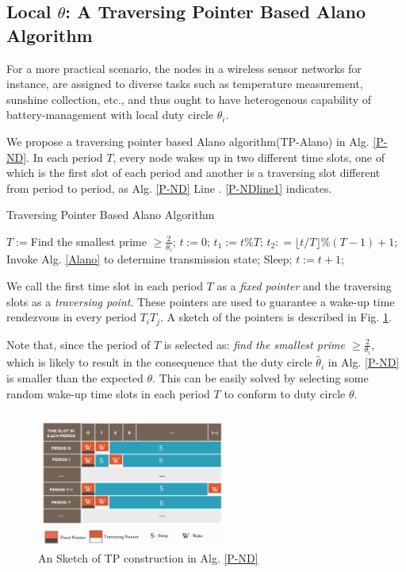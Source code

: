 


\subsection{Local $\theta$: A Traversing Pointer Based Alano Algorithm}


For a more practical scenario, the nodes in a wireless sensor networks 
for instance, are assigned to diverse tasks such as temperature measurement,
sunshine collection, etc., and thus ought to have heterogenous capability of
battery-management with local duty circle $\theta_i$.

We propose a traversing pointer based Alano algorithm(TP-Alano) in Alg. \ref{P-ND}.
In each period $T$, every node wakes up in two different time slots, one of which is the
first slot of each period and another is a traversing slot different from period to period, 
as Alg. \ref{P-ND} Line . \ref{P-NDline1} indicates. 

\begin{algorithm}
\caption{Traversing Pointer Based Alano Algorithm}
\label{P-ND}
\begin{algorithmic}[1]
\STATE $T := $Find the smallest prime $\geq \frac{2}{\theta_i}$;
\STATE $t := 0$;
	\STATE $t_1 := t \% T$;
	\STATE $t_2 : =\lfloor t / T \rfloor \% (T - 1) +1$;\label{P-NDline1}
    		\STATE Invoke Alg. \ref{Alano} to determine transmission state;
	\ELSE
    		\STATE Sleep;
	\ENDIF
	\STATE $t := t + 1$;
\ENDWHILE
\end{algorithmic}
\end{algorithm}

We call the first time slot in each period $T$ as a \emph{fixed pointer} and the traversing
slots as a \emph{traversing point}. These pointers are used to guarantee a wake-up time rendezvous
in every period $T_iT_j$. A sketch of the pointers is described in Fig. \ref{TP}.
 
Note that, since the period of $T$ is selected as: 
\emph{find the smallest prime $\geq \frac{2}{\theta_i}$},
which is likely to result in the consequence that the duty 
circle $\widetilde{\theta_i}$ in Alg. \ref{P-ND} is smaller than the expected
$\theta$. This can be easily solved by selecting some random wake-up time slots 
in each period $T$ to conform to duty circle $\theta$.

\begin{figure}[htb]
\centering
\includegraphics[width=2.5in]{./Figure/TP}
\caption{An Sketch of TP construction in Alg. \ref{P-ND}}
\label{TP}
\end{figure}

